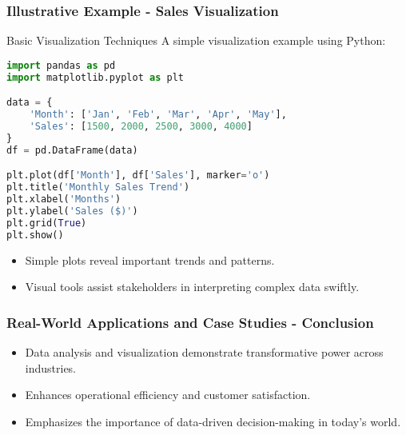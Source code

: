 \documentclass{beamer}
\begin{document}
\begin{frame}[fragile]
    \frametitle{Illustrative Example - Sales Visualization}
    \begin{block}{Basic Visualization Techniques}
        A simple visualization example using Python:
        \begin{lstlisting}[language=Python]
import pandas as pd
import matplotlib.pyplot as plt

data = {
    'Month': ['Jan', 'Feb', 'Mar', 'Apr', 'May'],
    'Sales': [1500, 2000, 2500, 3000, 4000]
}
df = pd.DataFrame(data)

plt.plot(df['Month'], df['Sales'], marker='o')
plt.title('Monthly Sales Trend')
plt.xlabel('Months')
plt.ylabel('Sales ($)')
plt.grid(True)
plt.show()
        \end{lstlisting}
    \end{block}
    \begin{itemize}
        \item Simple plots reveal important trends and patterns.
        \item Visual tools assist stakeholders in interpreting complex data swiftly.
    \end{itemize}
\end{frame}

\begin{frame}[fragile]
    \frametitle{Real-World Applications and Case Studies - Conclusion}
    \begin{itemize}
        \item Data analysis and visualization demonstrate transformative power across industries.
        \item Enhances operational efficiency and customer satisfaction.
        \item Emphasizes the importance of data-driven decision-making in today's world.
    \end{itemize}
\end{frame}
\end{document}
